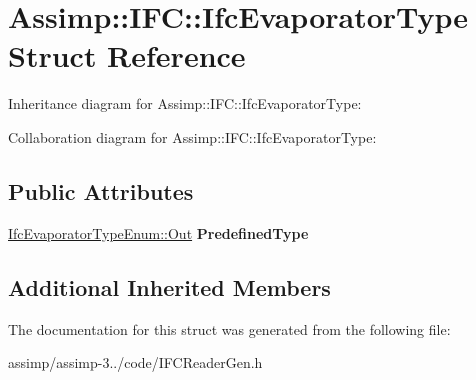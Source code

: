 \hypertarget{struct_assimp_1_1_i_f_c_1_1_ifc_evaporator_type}{\section{Assimp\+:\+:I\+F\+C\+:\+:Ifc\+Evaporator\+Type Struct Reference}
\label{struct_assimp_1_1_i_f_c_1_1_ifc_evaporator_type}
}


Inheritance diagram for Assimp\+:\+:I\+F\+C\+:\+:Ifc\+Evaporator\+Type\+:


Collaboration diagram for Assimp\+:\+:I\+F\+C\+:\+:Ifc\+Evaporator\+Type\+:
\subsection*{Public Attributes}
\begin{DoxyCompactItemize}
\item 
\hypertarget{struct_assimp_1_1_i_f_c_1_1_ifc_evaporator_type_a073c74fb729b6add37e6e69a87da4ed1}{\hyperlink{classboost_1_1shared__ptr}{Ifc\+Evaporator\+Type\+Enum\+::\+Out} {\bfseries Predefined\+Type}}\label{struct_assimp_1_1_i_f_c_1_1_ifc_evaporator_type_a073c74fb729b6add37e6e69a87da4ed1}

\end{DoxyCompactItemize}
\subsection*{Additional Inherited Members}


The documentation for this struct was generated from the following file\+:\begin{DoxyCompactItemize}
\item 
assimp/assimp-\/3../code/I\+F\+C\+Reader\+Gen.\+h\end{DoxyCompactItemize}
